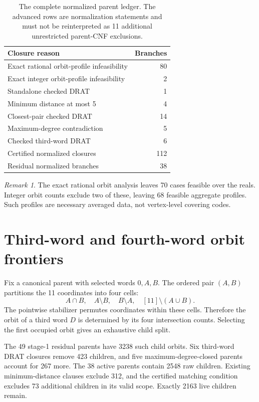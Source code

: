 \documentclass[11pt]{article}
\theoremstyle{definition}
\theoremstyle{remark}
\newtheorem{remark}[theorem]{Remark}
\begin{document}
\begin{table}[ht]
\centering
\begin{tabular}{@{}lr@{}}
\toprule
Closure reason & Branches \\
\midrule
Exact rational orbit-profile infeasibility & 80 \\
Exact integer orbit-profile infeasibility & 2 \\
Standalone checked DRAT & 1 \\
Minimum distance at most 5 & 4 \\
Closest-pair checked DRAT & 14 \\
Maximum-degree contradiction & 5 \\
Checked third-word DRAT & 6 \\
\midrule
Certified normalized closures & 112 \\
Residual normalized branches & 38 \\
\bottomrule
\end{tabular}
\caption{The complete normalized parent ledger.  The advanced rows are
normalization statements and must not be reinterpreted as 11 additional
unrestricted parent-CNF exclusions.}
\label{tab:parents}
\end{table}

\begin{remark}
The exact rational orbit analysis leaves 70 cases feasible over the
reals.  Integer orbit counts exclude two of these, leaving 68 feasible
aggregate profiles.  Such profiles are necessary averaged data, not
vertex-level covering codes.
\end{remark}

\section{Third-word and fourth-word orbit frontiers}

Fix a canonical parent with selected words $0,A,B$.  The ordered pair
$(A,B)$ partitions the 11 coordinates into four cells:
\[
  A\cap B,\quad A\setminus B,\quad B\setminus A,\quad
  [11]\setminus(A\cup B).
\]
The pointwise stabilizer permutes coordinates within these cells.
Therefore the orbit of a third word $D$ is determined by its four
intersection counts.  Selecting the first occupied orbit gives an
exhaustive child split.

The 49 stage-1 residual parents have 3238 such child orbits.  Six
third-word DRAT closures remove 423 children, and five
maximum-degree-closed parents account for 267 more.  The 38 active
parents contain 2548 raw children.  Existing minimum-distance clauses
exclude 312, and the certified matching condition excludes 73
additional children in its valid scope.  Exactly 2163 live children
remain.
\end{document}
